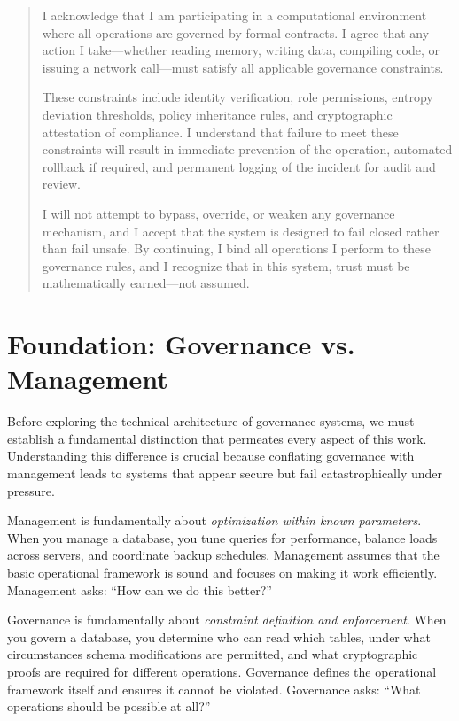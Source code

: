 \begin{quote}
I acknowledge that I am participating in a computational environment where all operations are governed by formal contracts. I agree that any action I take—whether reading memory, writing data, compiling code, or issuing a network call—must satisfy all applicable governance constraints. 

These constraints include identity verification, role permissions, entropy deviation thresholds, policy inheritance rules, and cryptographic attestation of compliance. I understand that failure to meet these constraints will result in immediate prevention of the operation, automated rollback if required, and permanent logging of the incident for audit and review. 

I will not attempt to bypass, override, or weaken any governance mechanism, and I accept that the system is designed to fail closed rather than fail unsafe. By continuing, I bind all operations I perform to these governance rules, and I recognize that in this system, trust must be mathematically earned—not assumed.
\end{quote}

\section{Foundation: Governance vs. Management}

Before exploring the technical architecture of governance systems, we must establish a fundamental distinction that permeates every aspect of this work. Understanding this difference is crucial because conflating governance with management leads to systems that appear secure but fail catastrophically under pressure.

Management is fundamentally about \textit{optimization within known parameters}. When you manage a database, you tune queries for performance, balance loads across servers, and coordinate backup schedules. Management assumes that the basic operational framework is sound and focuses on making it work efficiently. Management asks: ``How can we do this better?''

Governance is fundamentally about \textit{constraint definition and enforcement}. When you govern a database, you determine who can read which tables, under what circumstances schema modifications are permitted, and what cryptographic proofs are required for different operations. Governance defines the operational framework itself and ensures it cannot be violated. Governance asks: ``What operations should be possible at all?''

